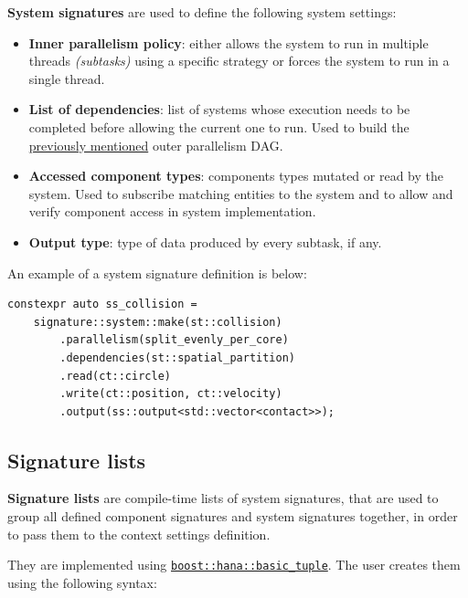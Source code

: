 \documentclass[twoside, 12pt, a4paper, openany]{book}
\begin{document}
\textbf{System signatures} are used to define the following system
settings:

\begin{itemize}
\item
  \textbf{Inner parallelism policy}: either allows the system to run in
  multiple threads \emph{(subtasks)} using a specific strategy or forces
  the system to run in a single thread.
\item
  \textbf{List of dependencies}: list of systems whose execution needs
  to be completed before allowing the current one to run. Used to build
  the \protect\hyperlink{overview_outer_parallelism_dag}{previously
  mentioned} outer parallelism DAG.
\item
  \textbf{Accessed component types}: components types mutated or read by
  the system. Used to subscribe matching entities to the system and to
  allow and verify component access in system implementation.
\item
  \textbf{Output type}: type of data produced by every subtask, if any.
\end{itemize}

An example of a system signature definition is below:

\begin{verbatim}
constexpr auto ss_collision =
    signature::system::make(st::collision)
        .parallelism(split_evenly_per_core)
        .dependencies(st::spatial_partition)
        .read(ct::circle)
        .write(ct::position, ct::velocity)
        .output(ss::output<std::vector<contact>>);
\end{verbatim}

\hypertarget{ctopts_siglist}{\subsection{Signature
lists}\label{ctopts_siglist}}

\textbf{Signature lists} are compile-time lists of system signatures,
that are used to group all defined component signatures and system
signatures together, in order to pass them to the context settings
definition.

They are implemented using
\href{http://www.boost.org/doc/libs/1_61_0/libs/hana/doc/html/structboost_1_1hana_1_1basic__tuple.html}{\texttt{boost::hana::basic_tuple}}.
The user creates them using the following syntax:
\end{document}
